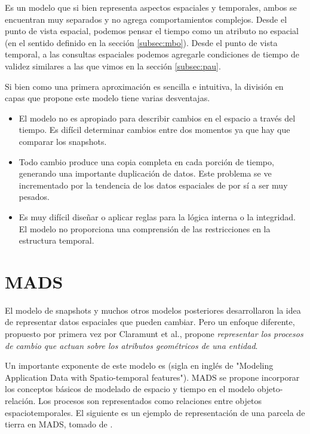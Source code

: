 Es un modelo que si bien representa aspectos espaciales y temporales,
ambos se encuentran muy separados y no agrega comportamientos complejos.
Desde el punto de vista espacial,
podemos pensar el tiempo como un atributo no espacial (en el sentido definido en la sección \ref{subsec:mbo}).
Desde el punto de vista temporal,
a las consultas espaciales podemos agregarle condiciones de tiempo de validez similares a las que vimos en la sección \ref{subsec:pau}.

Si bien como una primera aproximación es sencilla e intuitiva, la división en capas que propone este modelo tiene varias desventajas.
\begin{itemize}
    \item El modelo no es apropiado para describir cambios en el espacio a través del tiempo.
        Es difícil determinar cambios entre dos momentos ya que hay que comparar los snapshots.
    \item Todo cambio produce una copia completa en cada porción de tiempo,
        generando una importante duplicación de datos.
        Este problema se ve incrementado por la tendencia de los datos espaciales de por sí a ser muy pesados.
    \item Es muy difícil diseñar o aplicar reglas para la lógica interna o la integridad.
        El modelo no proporciona una comprensión de las restricciones en la estructura temporal.
\end{itemize}


\section{MADS}

El modelo de snapshots y muchos otros modelos posteriores desarrollaron la idea de representar datos espaciales que pueden cambiar.
Pero un enfoque diferente, propuesto por primera vez por Claramunt et al.\textsuperscript{\cite{CPS98}}, propone \textit{representar los procesos de cambio que actuan sobre los atributos geométricos de una entidad}.

Un importante exponente de este modelo es \textsuperscript{\cite{PSZ99}}
(sigla en inglés de "Modeling Application Data with Spatio-temporal features").
MADS se propone incorporar los conceptos básicos de modelado de espacio y tiempo en el modelo objeto-relación.
Los procesos son representados como relaciones entre objetos espaciotemporales. El siguiente es un ejemplo de representación de una parcela de tierra en MADS, tomado de \cite{sp:litreview}.

